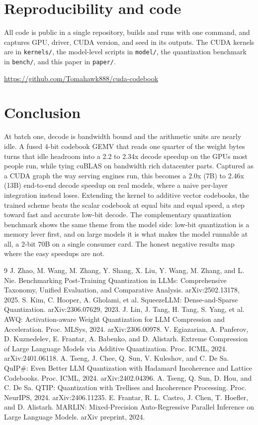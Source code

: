 \documentclass[11pt]{article}
\begin{document}
\section{Reproducibility and code}
All code is public in a single repository, builds and runs with one command, and
captures GPU, driver, CUDA version, and seed in its outputs. The CUDA kernels are in
\texttt{kernels/}, the model-level scripts in \texttt{model/}, the quantization
benchmark in \texttt{bench/}, and this paper in \texttt{paper/}.
\begin{center}
\url{https://github.com/Tomahawk888/cuda-codebook}
\end{center}

\section{Conclusion}
At batch one, decode is bandwidth bound and the arithmetic units are nearly idle.
A fused 4-bit codebook GEMV that reads one quarter of the weight bytes turns that
idle headroom into a 2.2 to 2.34x decode speedup on the GPUs most people run, while
tying cuBLAS on bandwidth rich datacenter parts. Captured as a CUDA graph the way
serving engines run, this becomes a 2.0x (7B) to 2.46x (13B) end-to-end decode
speedup on real models, where a naive per-layer integration instead loses. Extending
the kernel to additive vector codebooks, the trained scheme beats the scalar codebook
at equal bits and equal speed, a step toward fast and accurate low-bit decode. The
complementary quantization benchmark shows the same theme from the model side: low-bit
quantization is a memory lever first, and on large models it is what makes the model
runnable at all, a 2-bit 70B on a single consumer card. The honest negative results
map where the easy speedups are not.

\begin{thebibliography}{9}
 J. Zhao, M. Wang, M. Zhang, Y. Shang, X. Liu, Y. Wang, M. Zhang,
  and L. Nie. Benchmarking Post-Training Quantization in LLMs: Comprehensive
  Taxonomy, Unified Evaluation, and Comparative Analysis. arXiv:2502.13178, 2025.
 S. Kim, C. Hooper, A. Gholami, et al. SqueezeLLM:
  Dense-and-Sparse Quantization. arXiv:2306.07629, 2023.
 J. Lin, J. Tang, H. Tang, S. Yang, et al. AWQ: Activation-aware Weight
  Quantization for LLM Compression and Acceleration. Proc. MLSys, 2024.
  arXiv:2306.00978.
 V. Egiazarian, A. Panferov, D. Kuznedelev, E. Frantar, A. Babenko,
  and D. Alistarh. Extreme Compression of Large Language Models via Additive
  Quantization. Proc. ICML, 2024. arXiv:2401.06118.
 A. Tseng, J. Chee, Q. Sun, V. Kuleshov, and C. De Sa. QuIP\#:
  Even Better LLM Quantization with Hadamard Incoherence and Lattice Codebooks.
  Proc. ICML, 2024. arXiv:2402.04396.
 A. Tseng, Q. Sun, D. Hou, and C. De Sa. QTIP: Quantization with
  Trellises and Incoherence Processing. Proc. NeurIPS, 2024. arXiv:2406.11235.
 E. Frantar, R. L. Castro, J. Chen, T. Hoefler, and D. Alistarh.
  MARLIN: Mixed-Precision Auto-Regressive Parallel Inference on Large Language
  Models. arXiv preprint, 2024.
\end{thebibliography}
\end{document}

